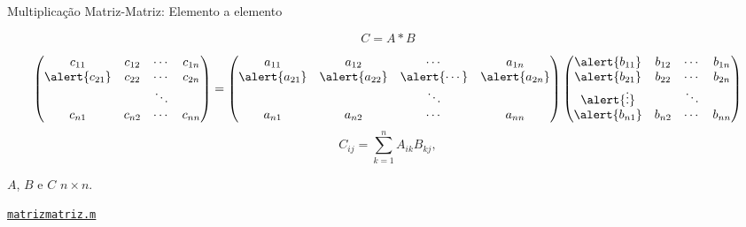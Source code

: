 \documentclass[hyperref={pdfpagelabels=false}]{beamer}
\begin{document}
\begin{frame}{Multiplicação Matriz-Matriz: Elemento a elemento}
  
  $$C = A*B$$

  \footnotesize{%
    \begin{equation*}
      \begin{pmatrix}
        c_{11} & c_{12} & \cdots & c_{1n} \\
        \alert{c_{21}} & c_{22} & \cdots & c_{2n} \\
        &        & \ddots &        \\
        c_{n1} & c_{n2} & \cdots & c_{nn}
      \end{pmatrix}
      =
      \begin{pmatrix} 
        a_{11} & a_{12} & \cdots & a_{1n}\\ 
        \alert{a_{21}} & \alert{a_{22}} & \alert{\cdots} & \alert{a_{2n}}\\
        & & \ddots & \\ 
        a_{n1} & a_{n2} & \cdots & a_{nn} 
      \end{pmatrix}
      \begin{pmatrix}
        \alert{b_{11}} & b_{12} & \cdots & b_{1n}\\ 
        \alert{b_{21}} & b_{22} & \cdots & b_{2n}\\
        \alert{\vdots} & & \ddots & \\ 
        \alert{b_{n1}} & b_{n2} & \cdots & b_{nn} 
      \end{pmatrix}
    \end{equation*}
    }
  \vfill
  $$C_{ij} = \sum_{k=1}^n A_{ik}B_{kj},$$
  
  $A$, $B$ e $C$ $n\times n$. 
  
  \begin{center} \href{listings/matrizmatriz.m}{\underline{\texttt{matrizmatriz.m}}} \end{center}
\end{frame}
\end{document}
